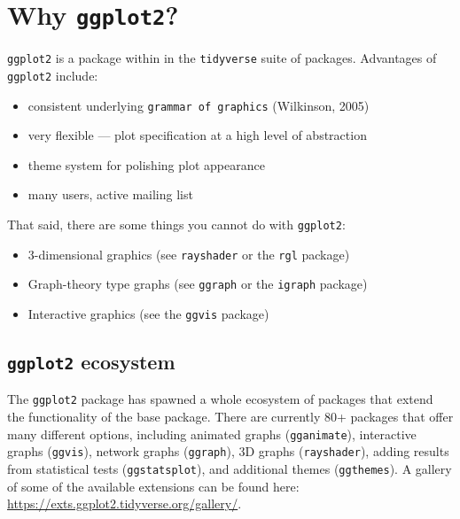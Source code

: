 \documentclass[
]{book}
\providecommand{\tightlist}{%
  \setlength{\itemsep}{0pt}\setlength{\parskip}{0pt}}
\begin{document}
\hypertarget{why-ggplot2}{%
\section{\texorpdfstring{Why \texttt{ggplot2}?}{Why ggplot2?}}\label{why-ggplot2}}

\texttt{ggplot2} is a package within in the \texttt{tidyverse} suite of packages. Advantages of \texttt{ggplot2} include:

\begin{itemize}
\tightlist
\item
  consistent underlying \texttt{grammar\ of\ graphics} (Wilkinson, 2005)
\item
  very flexible --- plot specification at a high level of abstraction
\item
  theme system for polishing plot appearance
\item
  many users, active mailing list
\end{itemize}

That said, there are some things you cannot do with \texttt{ggplot2}:

\begin{itemize}
\tightlist
\item
  3-dimensional graphics (see \texttt{rayshader} or the \texttt{rgl} package)
\item
  Graph-theory type graphs (see \texttt{ggraph} or the \texttt{igraph} package)
\item
  Interactive graphics (see the \texttt{ggvis} package)
\end{itemize}

\hypertarget{ggplot2-ecosystem}{%
\subsection{\texorpdfstring{\texttt{ggplot2} ecosystem}{ggplot2 ecosystem}}\label{ggplot2-ecosystem}}

The \texttt{ggplot2} package has spawned a whole ecosystem of packages that extend the functionality of the base package. There are currently 80+ packages that offer many different options, including animated graphs (\texttt{gganimate}), interactive graphs (\texttt{ggvis}), network graphs (\texttt{ggraph}), 3D graphs (\texttt{rayshader}), adding results from statistical tests (\texttt{ggstatsplot}), and additional themes (\texttt{ggthemes}). A gallery of some of the available extensions can be found here: \url{https://exts.ggplot2.tidyverse.org/gallery/}.
\end{document}
